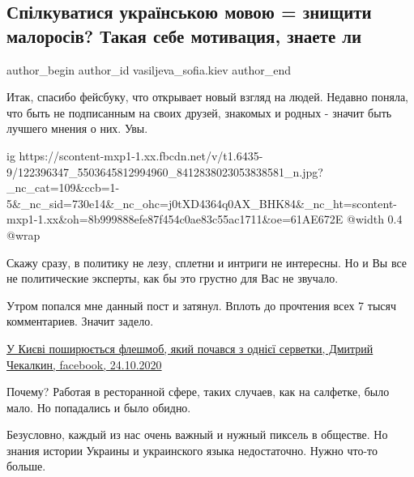  
 
 
 
 
 
\subsection{Спілкуватися українською мовою = знищити малоросів? Такая себе мотивация, знаете ли}
\label{sec:26_10_2021.fb.vasiljeva_sofia.kiev.1.mova_restoran_salfetka}
 
\ifcmt
 author_begin
   author_id vasiljeva_sofia.kiev
 author_end
\fi

Итак, спасибо фейсбуку, что открывает новый взгляд на людей. Недавно поняла,
что быть не подписанным на своих друзей, знакомых и родных - значит быть
лучшего мнения о них. Увы. 

\ifcmt
  ig https://scontent-mxp1-1.xx.fbcdn.net/v/t1.6435-9/122396347_5503645812994960_8412838023053838581_n.jpg?_nc_cat=109&ccb=1-5&_nc_sid=730e14&_nc_ohc=j0tXD4364q0AX_BHK84&_nc_ht=scontent-mxp1-1.xx&oh=8b999888efe87f454c0ae83c55ac1711&oe=61AE672E
  @width 0.4
  @wrap 
\fi

Скажу сразу, в политику не лезу, сплетни и интриги не интересны. Но и Вы все не
политические эксперты, как бы это грустно для Вас не звучало. 

Утром попался мне данный пост и затянул. Вплоть до прочтения всех 7 тысяч
комментариев. Значит задело. 

\href{https://www.facebook.com/permalink.php?story_fbid=5503649732994568&id=365125280180398}{%
У Києві поширюється флешмоб, який почався з однієї серветки, Дмитрий Чекалкин, facebook, 24.10.2020%
}

Почему? Работая в ресторанной сфере, таких случаев, как на салфетке, было мало.
Но попадались и было обидно. 

Безусловно, каждый из нас очень важный и нужный пиксель в обществе. Но знания
истории Украины и украинского языка недостаточно. Нужно что-то больше. 

